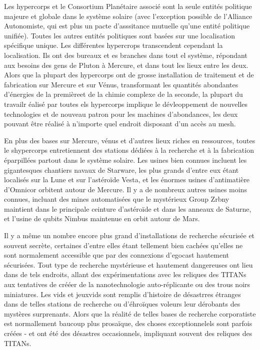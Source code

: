 Les hypercorps et le Consortium Planétaire associé sont la seule entités politique majeure et globale dans le système solaire (avec l'exception possible de l'Alliance Autonomiste, qui est plus un pacte d'asssitance mutuelle qu'une entité politique unifiée). Toutes les autres entités politiques sont basées sur une localisation spécifique unique. Les différentes hypercrops transcendent cependant la localisation. Ils ont des bureaux et es branches dans tout el système, répondant aux besoins des gens de Pluton à Mercure, et dans tout les lieux entre les deux. Alors que la plupart des hypercorps ont de grosse installation de traitement et de fabrication sur Mercure et sur Vénus, transformant les quantités abondantes d'énergies de la premièreet de la chimie complexe de la seconde, la plupart du travailr éalisé par toutes els hypercorps implique le dévleoppement de nouvelles technologies et de nouveau patron pour les machines d'abondances, les deux pouvant être réalisé à n'importe quel endroit disposant d'un accès au mesh. 

En plus des bases sur Mercure, vénus et d'autres lieux riches en ressources, toutes le shypercorps entretiennent des stations dédiées à la recherche et à la fabrication éparpillées partout dans le système solaire. Les usines bien connues incluent les gigantesques chantiers navaux de Starware, les plus grands d'entre eux étant localisés sur la Lune et sur l'astéroïde Vesta, et les énormes usines d'antimatière d'Omnicor orbitent autour de Mercure. Il y a de nombreux autres usines moins connues, incluant des mines automatisées que le mystérieux Group Zrbny maintient dans le principale ceinture d'astéroïde et dans les anneaux de Saturne, et l'usine de qubits Nimbus maintenue en orbit autour de Mars. 

Il y a même un nombre encore plus grand d'installations de recherche sécurisée et souvent secrète, certaines d'entre elles étant tellement bien cachées qu'elles ne sont normalement accessible que par des connexions d'egocast hautement sécurisées. Tout type de recherche mystérieuse et hautement dangereuses ont lieu dans de tels endroits, allant des expérimentations avec les reliques des TITANs aux tentatives de crééer de la nanotechnologie auto-réplicante ou des trous noirs miniatures. Les vids et jeuxvids sont remplis d'histoire de désastrres étranges dans de telles stations de recherche ou d'éhroïques voleurs leur dérobants des mystères surprenants. Alors que la réalité de telles bases de recherche corporatiste est normallement baucoup plus prosaïque, des choses exceptionnelels sont parfois créées - et ont été des désastres occasionnels, impliquant souvent des reliques des TITANs. 

